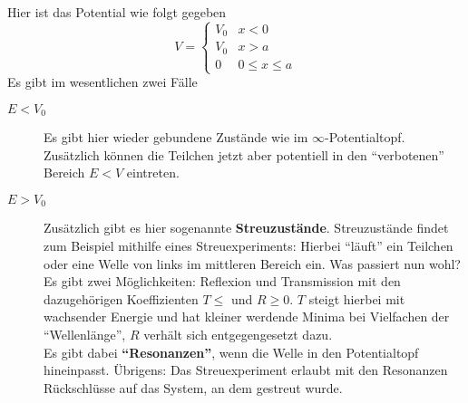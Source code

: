 \begin{beispiel*}
	Hier ist das Potential wie folgt gegeben
	$$V = \begin{cases}
	V_0 & x < 0\\
	V_0 & x > a\\
	0 & 0 \le x \le a
	\end{cases}$$
	Es gibt im wesentlichen zwei Fälle
	\begin{description}
		\item[$E < V_0$] Es gibt hier wieder gebundene Zustände wie im $\infty$-Potentialtopf. Zusätzlich können die Teilchen jetzt aber potentiell in den "`verbotenen"' Bereich $E < V$ eintreten.
		\item[$E > V_0$] Zusätzlich gibt es hier sogenannte \textbf{Streuzustände}. Streuzustände findet zum Beispiel mithilfe eines Streuexperiments: Hierbei "`läuft"' ein Teilchen oder eine Welle von links im mittleren Bereich ein. Was passiert nun wohl?\\
		Es gibt zwei Möglichkeiten: Reflexion und Transmission mit den dazugehörigen Koeffizienten $T \leq$ und $R \geq 0$. $T$ steigt hierbei mit wachsender Energie und hat kleiner werdende Minima bei Vielfachen der "`Wellenlänge"', $R$ verhält sich entgegengesetzt dazu.\\
		 Es gibt dabei \textbf{"`Resonanzen"'}, wenn die Welle in den Potentialtopf hineinpasst. Übrigens: Das Streuexperiment erlaubt mit den Resonanzen Rückschlüsse auf das System, an dem gestreut wurde.
	\end{description}
\end{beispiel*}

